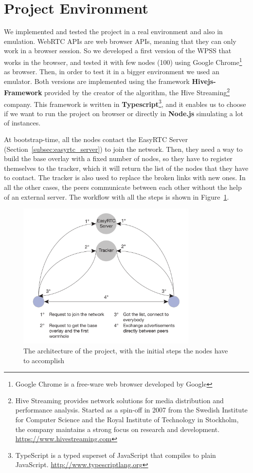 \section{Project Environment}
\label{cha:design}
We implemented and tested the project in a real environment and also in emulation. WebRTC APIs are web browser APIs, meaning that they can only work in a browser session. So we developed a first version of the \ac{WPSS} that works in the browser, and tested it with few nodes (100) using Google Chrome\footnote{Google Chrome is a free-ware web browser developed by Google} as browser. Then, in order to test it in a bigger environment we used an emulator. Both versions are implemented using the framework \textbf{Hivejs-Framework} provided by the creator of the algorithm, the Hive Streaming\footnote{Hive Streaming provides network solutions for media distribution and performance analysis. Started as a spin-off in 2007 from the Swedish Institute for Computer Science and the Royal Institute of Technology in Stockholm, the company maintains a strong focus on research and development. \url{https://www.hivestreaming.com}} company. This framework is written in \textbf{Typescript}\footnote{TypeScript is a typed superset of JavaScript that compiles to plain JavaScript. \url{http://www.typescriptlang.org}}, and it enables us to choose if we want to run the project on browser or directly in \textbf{Node.js} simulating a lot of instances. 

At bootstrap-time, all the nodes contact the EasyRTC Server (Section~\ref{subsec:easyrtc_server}) to join the network. Then, they need a way to build the base overlay with a fixed number of nodes, so they have to register themselves to the tracker, which it will return the list of the nodes that they have to contact. The tracker is also used to replace the broken links with new ones. In all the other cases, the peers communicate between each other without the help of an external server. The workflow with all the steps is shown in Figure~\ref{fig:project_architecture}.

\begin{figure}[ht]
  \centering
  \includegraphics[keepaspectratio=true, width=0.8\textwidth]{images/project_architecture}\caption{The architecture of the project, with the initial steps the nodes have to accomplish}
  \label{fig:project_architecture}
\end{figure}


